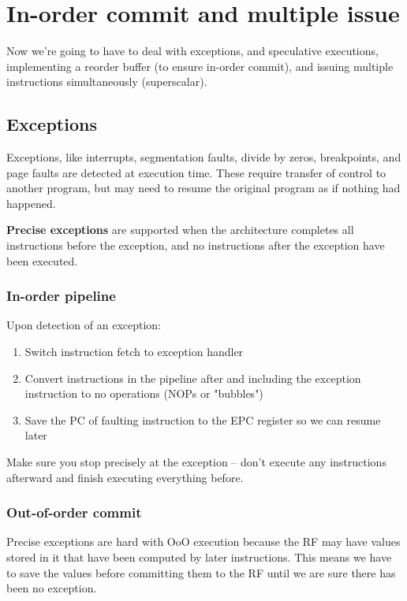 \documentclass{article}
\begin{document}
\section{In-order commit and multiple issue}

Now we're going to have to deal with exceptions, and speculative executions, implementing a reorder buffer (to ensure in-order commit), and issuing multiple instructions simultaneously (superscalar). 

\subsection{Exceptions}

Exceptions, like interrupts, segmentation faults, divide by zeros, breakpoints, and page faults are detected at execution time. These require transfer of control to another program, but may need to resume the original program as if nothing had happened.

\textbf{Precise exceptions} are supported when the architecture completes all instructions before the exception, and no instructions after the exception have been executed. 

\subsubsection{In-order pipeline}

Upon detection of an exception:

\begin{enumerate}
\item Switch instruction fetch to exception handler

\item Convert instructions in the pipeline after and including the exception instruction to no operations (NOPs or "bubbles")

\item Save the PC of faulting instruction to the EPC register so we can resume later
\end{enumerate}

Make sure you stop precisely at the exception -- don't execute any instructions afterward and finish executing everything before.

\subsubsection{Out-of-order commit}

Precise exceptions are hard with OoO execution because the RF may have values stored in it that have been computed by later instructions. This means we have to save the values before committing them to the RF until we are sure there has been no exception. 
\end{document}
